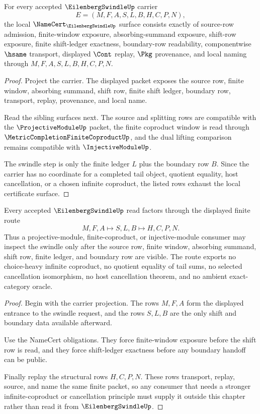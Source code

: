\begin{theorem}
\label{thm:eilenberg-swindle-namecert-obligations}
For every accepted $\EilenbergSwindleUp$ carrier
$$
E=(M,F,A,S,L,B,H,C,P,N),
$$
the local $\NameCert_{\EilenbergSwindleUp}$ surface consists exactly of source-row admission, finite-window exposure, absorbing-summand exposure, shift-row exposure, finite shift-ledger exactness, boundary-row readability, componentwise $\hsame$ transport, displayed $\Cont$ replay, $\Pkg$ provenance, and local naming through $M,F,A,S,L,B,H,C,P,N$.
\end{theorem}
\begin{proof}
Project the carrier. The displayed packet exposes the source row, finite window, absorbing summand, shift row, finite shift ledger, boundary row, transport, replay, provenance, and local name.

Read the sibling surfaces next. The source and splitting rows are compatible with the $\ProjectiveModuleUp$ packet, the finite coproduct window is read through $\MetricCompletionFiniteCoproductUp$, and the dual lifting comparison remains compatible with $\InjectiveModuleUp$.

The swindle step is only the finite ledger $L$ plus the boundary row $B$. Since the carrier has no coordinate for a completed tail object, quotient equality, host cancellation, or a chosen infinite coproduct, the listed rows exhaust the local certificate surface.
\end{proof}

\begin{theorem}
\label{thm:eilenberg-swindle-shift-ledger-route}
Every accepted $\EilenbergSwindleUp$ read factors through the displayed finite route
$$
M,F,A \longmapsto S,L,B \longmapsto H,C,P,N.
$$
Thus a projective-module, finite-coproduct, or injective-module consumer may inspect the swindle only after the source row, finite window, absorbing summand, shift row, finite ledger, and boundary row are visible. The route exports no choice-heavy infinite coproduct, no quotient equality of tail sums, no selected cancellation isomorphism, no host cancellation theorem, and no ambient exact-category oracle.
\end{theorem}
\begin{proof}
Begin with the carrier projection. The rows $M,F,A$ form the displayed entrance to the swindle request, and the rows $S,L,B$ are the only shift and boundary data available afterward.

Use the NameCert obligations. They force finite-window exposure before the shift row is read, and they force shift-ledger exactness before any boundary handoff can be public.

Finally replay the structural rows $H,C,P,N$. These rows transport, replay, source, and name the same finite packet, so any consumer that needs a stronger infinite-coproduct or cancellation principle must supply it outside this chapter rather than read it from $\EilenbergSwindleUp$.
\end{proof}


